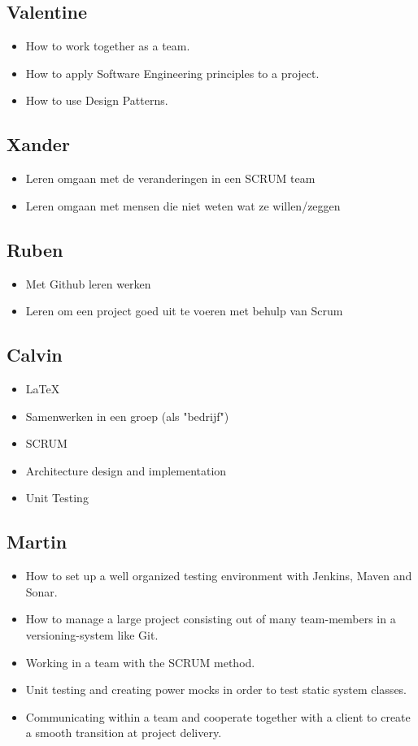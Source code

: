 \documentclass{article}
\begin{document}
\subsection*{Valentine}
\begin{itemize}
	\item How to work together as a team.
	\item How to apply Software Engineering principles to a project.
	\item How to use Design Patterns.
\end{itemize}

\subsection*{Xander}
\begin{itemize}
	\item Leren omgaan met de veranderingen in een SCRUM team
	\item Leren omgaan met mensen die niet weten wat ze willen/zeggen
\end{itemize}

\subsection*{Ruben}
\begin{itemize}
	\item Met Github leren werken
	\item Leren om een project goed uit te voeren met behulp van Scrum
\end{itemize}
\subsection*{Calvin}
\begin{itemize}
 	\item \LaTeX
	\item Samenwerken in een groep (als "bedrijf")
	\item SCRUM
	\item Architecture design and  implementation
	\item Unit Testing
\end{itemize}
\subsection*{Martin}
\begin{itemize}
  \item How to set up a well organized testing environment with Jenkins, Maven and Sonar.
  \item How to manage a large project consisting out of many team-members in a versioning-system like Git.
  \item Working in a team with the SCRUM method.
  \item Unit testing and creating power mocks in order to test static system classes.
  \item Communicating within a team and cooperate together with a client to create a smooth transition at project delivery.
\end{itemize}
\end{document}
